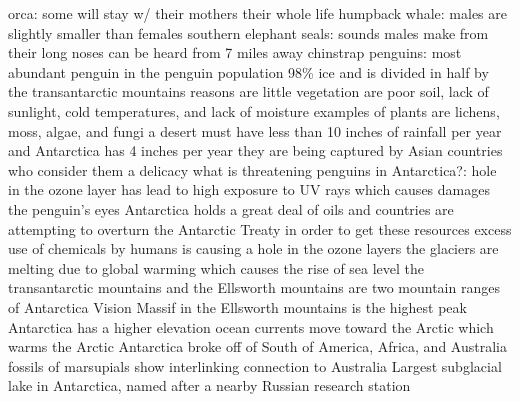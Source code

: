 \ddd {} orca: some will stay w/ their mothers their whole life humpback whale: males are slightly smaller than females southern elephant seals: sounds males make from their long noses can be heard from 7 miles away chinstrap penguins: most abundant penguin in the penguin population \ddd {} 98\% ice and is divided in half by the transantarctic mountains reasons are little vegetation are poor soil, lack of sunlight, cold temperatures, and lack of moisture examples of plants are lichens, moss, algae, and fungi \ddd {} a desert must have less than 10 inches of rainfall per year and Antarctica has 4 inches per year \ddd {} they are being captured by Asian countries who consider them a delicacy \ddd what is threatening penguins in Antarctica?: hole in the ozone layer has lead to high exposure to UV rays which causes damages the penguin's eyes \ddd {} Antarctica holds a great deal of oils and countries are attempting to overturn the Antarctic Treaty in order to get these resources \ddd {} excess use of chemicals by humans is causing a hole in the ozone layers \ddd {} the glaciers are melting due to global warming which causes the rise of sea level \ddd {} the transantarctic mountains and the Ellsworth mountains are two mountain ranges of Antarctica Vision Massif in the Ellsworth mountains is the highest peak \ddd {} Antarctica has a higher elevation ocean currents move toward the Arctic which warms the Arctic \ddd {}Antarctica broke off of South of America, Africa, and Australia fossils of marsupials show interlinking connection to Australia \ddd
{} Largest subglacial lake in Antarctica, named after a nearby Russian research station 